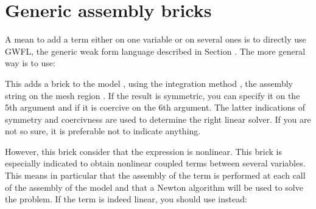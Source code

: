 \documentclass[a4paper,11pt,english]{sphinxmanual}
\begin{document}
\section{Generic assembly bricks}
\label{\detokenize{userdoc/model_generic_assembly:generic-assembly-bricks}}\label{\detokenize{userdoc/model_generic_assembly:ud-model-generic-assembly}}\label{\detokenize{userdoc/model_generic_assembly:index-0}}\label{\detokenize{userdoc/model_generic_assembly::doc}}
A mean to add a term either on one variable or on several ones is to directly use GWFL, the generic weak form language described in Section {\hyperref[\detokenize{userdoc/gasm_high:ud-gasm-high}]{}}. The more general way is to use:

\begin{sphinxVerbatim}[commandchars=\\\{\}]
   
                              
\end{sphinxVerbatim}

This adds a brick to the model , using the integration method , the assembly string  on the mesh region . If the result is symmetric, you can specify it on the 5th argument and if it is coercive on the 6th argument. The latter indications of symmetry and coercivness are used to determine the right linear solver. If you are not so sure, it is preferable not to indicate anything.

However, this brick consider that the expression is nonlinear. This brick is especially indicated to obtain nonlinear coupled terms between several variables. This means in particular that the assembly of the term is performed at each call of the assembly of the model and that a Newton algorithm will be used to solve the problem. If the term is indeed linear, you should use instead:

\begin{sphinxVerbatim}[commandchars=\\\{\}]
   
                               
\end{sphinxVerbatim}
\end{document}
